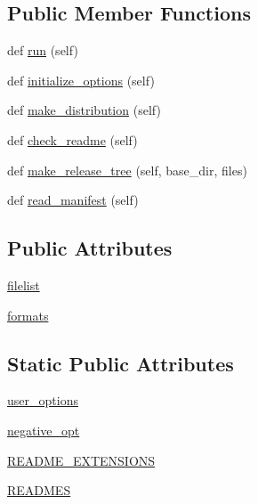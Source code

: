 \subsection*{Public Member Functions}
\begin{DoxyCompactItemize}
\item 
def \hyperlink{classsetuptools_1_1command_1_1sdist_1_1sdist_aff1d5d55ae04ff524b1b5ba77818bf58}{run} (self)
\item 
def \hyperlink{classsetuptools_1_1command_1_1sdist_1_1sdist_a96d37cc74ac618035e3ffb7bbaf99c66}{initialize\+\_\+options} (self)
\item 
def \hyperlink{classsetuptools_1_1command_1_1sdist_1_1sdist_ae6d47a19d2e20da1f420b9ce2daeec72}{make\+\_\+distribution} (self)
\item 
def \hyperlink{classsetuptools_1_1command_1_1sdist_1_1sdist_a5339db604af6411e31796c32142b0365}{check\+\_\+readme} (self)
\item 
def \hyperlink{classsetuptools_1_1command_1_1sdist_1_1sdist_ad498b313d40b183b6edb6e66956dbf0b}{make\+\_\+release\+\_\+tree} (self, base\+\_\+dir, files)
\item 
def \hyperlink{classsetuptools_1_1command_1_1sdist_1_1sdist_a1b7a74f9d8dda385451371dea8b113d1}{read\+\_\+manifest} (self)
\end{DoxyCompactItemize}
\subsection*{Public Attributes}
\begin{DoxyCompactItemize}
\item 
\hyperlink{classsetuptools_1_1command_1_1sdist_1_1sdist_a6a32cd8d6db51f0418ef5208afdb19bd}{filelist}
\item 
\hyperlink{classsetuptools_1_1command_1_1sdist_1_1sdist_a248f0c606dc63eaaa199d3fe82fbfa51}{formats}
\end{DoxyCompactItemize}
\subsection*{Static Public Attributes}
\begin{DoxyCompactItemize}
\item 
\hyperlink{classsetuptools_1_1command_1_1sdist_1_1sdist_a6269f2589afcdcde3d97d7c55cee2741}{user\+\_\+options}
\item 
\hyperlink{classsetuptools_1_1command_1_1sdist_1_1sdist_ad9e145c49831cb911546e2194794c0db}{negative\+\_\+opt}
\item 
\hyperlink{classsetuptools_1_1command_1_1sdist_1_1sdist_a130e367e9500d2de47ae127b03c8a009}{R\+E\+A\+D\+M\+E\+\_\+\+E\+X\+T\+E\+N\+S\+I\+O\+NS}
\item 
\hyperlink{classsetuptools_1_1command_1_1sdist_1_1sdist_a53e578eef1ed5cc6ac88e5b999530886}{R\+E\+A\+D\+M\+ES}
\end{DoxyCompactItemize}


